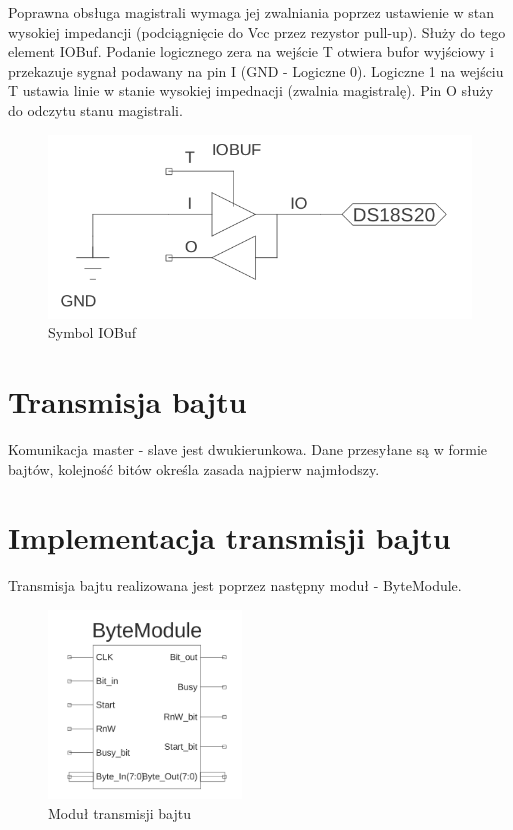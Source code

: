 \documentclass[a4paper]{article}
\begin{document}
Poprawna obsługa magistrali wymaga jej zwalniania poprzez ustawienie w stan wysokiej impedancji (podciągnięcie do Vcc przez rezystor pull-up). Służy do tego element IOBuf. Podanie logicznego zera na wejście T otwiera bufor wyjściowy i przekazuje sygnał podawany na pin I (GND - Logiczne 0). Logiczne 1 na wejściu T ustawia linie w stanie wysokiej impednacji (zwalnia magistralę). Pin O służy do odczytu stanu magistrali.

\begin{figure}[!h]
\begin{center}
\includegraphics[scale=1.4]{graphics/io_buf_sym.png}
\end{center}
\caption{Symbol IOBuf}
\label{iobuf_controller_sym}
\end{figure}

\section{Transmisja bajtu}

Komunikacja master - slave jest dwukierunkowa. Dane przesyłane są w formie bajtów, kolejność bitów określa zasada najpierw najmłodszy. 

\section{Implementacja transmisji bajtu}

Transmisja bajtu realizowana jest poprzez następny moduł - ByteModule. 

\begin{figure}[h!]
\begin{center}
\includegraphics[height=5cm]{graphics/byte_module_sym.png}
\end{center}
\caption{Moduł transmisji bajtu}
\label{byte_module_sym}
\end{figure}
\end{document}
